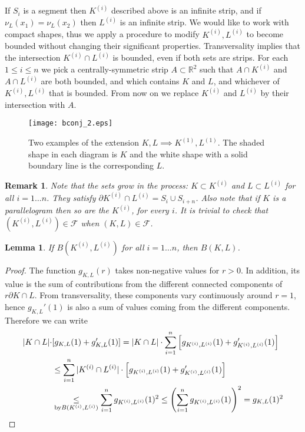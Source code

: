 \documentclass[a4paper,10pt,twoside,reqno,intlimits]{amsart}
\newtheorem*{lemma}{Lemma}
\newtheorem*{remark}{Remark}
\begin{document}
If $S_i$ is a segment then $K^{(i)}$ described above is an infinite strip,
and if $\nu_L(x_1) = \nu_L(x_2)$ then $L^{(i)}$ is an infinite strip.
We would like to work with compact shapes, thus we apply a procedure to modify $K^{(i)}, L^{(i)}$
to become bounded without changing their significant properties.
Transversality implies that the intersection $K^{(i)} \cap L^{(i)}$ is bounded, even if both sets are strips.
For each $1 \le i \le n$ we pick a centrally-symmetric strip $A \subset {\mathbb{R}}^2$ such that $A \cap K^{(i)}$
and $A \cap L^{(i)}$ are both bounded, and which contains $K$ and $L$, and whichever of
$K^{(i)},L^{(i)}$ that is bounded.
From now on we replace $K^{(i)}$ and $L^{(i)}$ by their intersection with $A$.

\begin{figure}[h!]
\texttt{[image: bconj\_2.eps]}
\caption{Two examples of the extension $K, L \implies K^{(1)}, L^{(1)}$.
\small The shaded shape in each diagram is $K$ and the white shape with a solid boundary line is the corresponding $L$.}
\label{fig:extension}
\end{figure}

\begin{remark}
Note that the sets grow in the process: $K \subset K^{(i)}$ and $L \subset L^{(i)}$ for all $i = 1 \ldots n$.
They satisfy ${\partial K}^{(i)} \cap L^{(i)} = S_i \cup S_{i+n}$.
Also note that if $K$ is a parallelogram then so are the $K^{(i)}$, for every $i$.
It is trivial to check that $(K^{(i)},L^{(i)}) \in {\mathcal{F}}$ when $(K,L) \in {\mathcal{F}}$.
\end{remark}

\begin{lemma}
If $B(K^{(i)}, L^{(i)})$ for all $i = 1 \ldots n$, then $B(K,L)$.
\end{lemma}
\begin{proof}
The function $g_{K,L}(r)$ takes non-negative values for $r>0$.
In addition, its value is the sum of contributions from the different connected components of ${r{\partial K} \cap L}$.
From transversality, these components vary continuously around ${r=1}$, hence $g_{K,L}'(1)$ is also a sum of
values coming from the different components.
Therefore we can write
\begin{align*}
|K \cap L| \cdot & [g_{K,L}(1) + g_{K,L}'(1)] = |K \cap L| \cdot \sum _{i=1}^{n} \left[ g_{K^{(i)},L^{(i)}}(1) + g_{K^{(i)},L^{(i)}}'(1) \right] \\
  & \le \sum _{i=1}^{n} |K^{(i)} \cap L^{(i)}| \cdot \left[ g_{K^{(i)},L^{(i)}}(1) + g_{K^{(i)},L^{(i)}}'(1) \right] \\
  & \underset{\text{by} B(K^{(i)},L^{(i)})}{\le} \sum _{i=1}^{n} g_{K^{(i)},L^{(i)}}(1)^2 \le \left( \sum _{i=1}^{n} g_{K^{(i)},L^{(i)}}(1) \right) ^2 = g_{K,L}(1)^2
\qedhere
\end{align*}
\end{proof}
\end{document}
